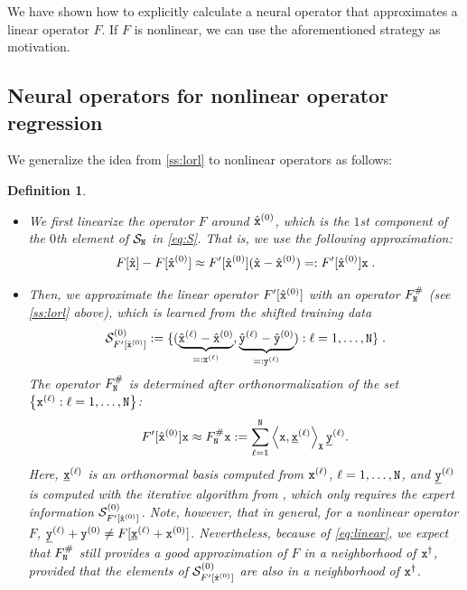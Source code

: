 \documentclass[10pt]{article}
\numberwithin{equation}{section}
\newtheorem{definition}[definition]{Definition}
\theoremstyle{nonumberplain}
\newcommand{\set}[1]{\left\{#1\right\}}
\newcommand{\inner}[2]{\left<#1,#2\right>}
\newcommand{\X}{{\tt X}}
\newcommand{\y}{{\tt y}}
\newcommand{\x}{{\tt x}}
\newcommand{\xdag}{\x^\dagger}
\newcommand{\ulx}{\underline{\x}}
\newcommand{\uly}{\underline{\y}}
\newcommand{\no}{{\tt N}}
\begin{document}
We have shown how to explicitly calculate a neural operator that approximates a linear operator $F$. If $F$ is nonlinear, we can use the aforementioned strategy as motivation.

\subsection{Neural operators for nonlinear operator regression}
We generalize the idea from \autoref{ss:lorl} to nonlinear operators as follows:
\begin{definition} \label{de:tildeF}
\begin{itemize}
	\item We first linearize the operator $F$ around $\hat{\x}^{(0)}$, which is the $1$st component of the $0$th element of $\mathcal{S}_\no$ in  \autoref{eq:S}. That is, we use the following approximation:
	\begin{equation}\label{eq:linear}
		F[\hat{\x}] - F[\hat{\x}^{(0)}] \approx F'[\hat{\x}^{(0)}](\hat{\x}-\hat{\x}^{(0)}) =: F'[\hat{\x}^{(0)}]\x\;.
	\end{equation}
    \item Then, we approximate the linear operator $F'[\hat{\x}^{(0)}]$ with an operator $F_\no^\#$ (see \autoref{ss:lorl} above), which is learned from the shifted training data 
    \begin{equation} \label{eq:S_G}
    	 \mathcal{S}_{F'[\hat{\x}^{(0)}]}^{(0)} := \{(\underbrace{\hat{\x}^{(\ell)}-\hat{\x}^{(0)}}_{=:\x^{(\ell)}},\underbrace{\hat{\y}^{(\ell)}-\hat{\y}^{(0)}}_{=:\y^{(\ell)}}) : \ell=1,\dots,\no \}\;.
    \end{equation}
    The operator $F_\no^\#$ is determined after orthonormalization of the set $\set{\x^{(\ell)}: \ell =1,\ldots,\no}$:
    \begin{equation} \label{eq:lin}
    	F'[\hat{\x}^{(0)}] \x \approx F_\no^\# \x := \sum_{\ell=1}^\no \inner{\x}{\ulx^{(\ell)}}_\X \uly^{(\ell)}.
    \end{equation}
    Here, $\ulx^{(\ell)}$ is an orthonormal basis computed from $\x^{(\ell)}$, $\ell=1,\dots,\no$, and $\uly^{(\ell)}$ is computed with the iterative algorithm from \cite{AspFriSch24_preprint}, which only requires the expert information $ \mathcal{S}_{F'[\hat{\x}^{(0)}]}^{(0)}$. Note, however, that in general, for a nonlinear operator $F$, $\uly^{(\ell)} +\y^{(0)} \neq F[\ulx^{(\ell)}+\x^{(0)}]$. 
    Nevertheless, because of \autoref{eq:linear}, we expect that $F_\no^\#$ still provides a good approximation of $F$ in a neighborhood of $\xdag$, provided that the elements of $ \mathcal{S}_{F'[\hat{\x}^{(0)}]}^{(0)}$ are also in a neighborhood of $\xdag$.

\end{itemize}
\end{definition}
\end{document}
